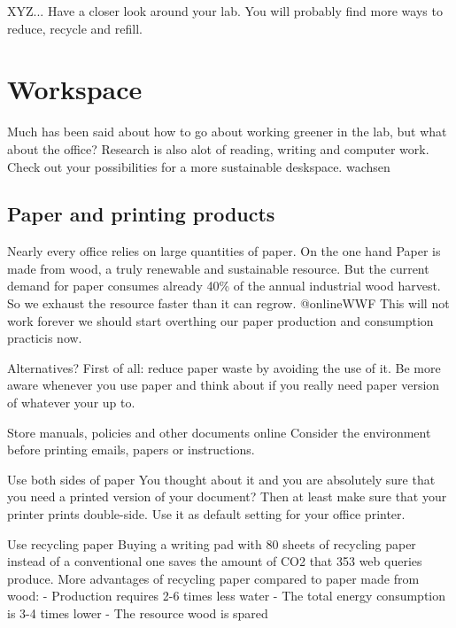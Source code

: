 \begin{suggest}{XYZ...}
	Have a closer look around your lab. You will probably find more ways to reduce, recycle and refill. 
\end{suggest}


\section{Workspace}

 Much has been said about how to go about working greener in the lab, but what about the office? Research is also alot of reading, writing and computer work. Check out your possibilities for a more sustainable deskspace. 
 wachsen
\subsection{Paper and printing products}
	
	Nearly every office relies on large quantities of paper. On the one hand Paper is made from wood, a truly renewable and sustainable resource. But the current demand for paper consumes already 40\% of the annual industrial wood harvest. So we exhaust the resource faster than it can regrow.  @online{WWF} This will not work forever we should start overthing our paper production and consumption practicis now. 

\begin{suggest}{Alternatives?}
	First of all: reduce paper waste by avoiding the use of it. 
	Be more aware whenever you use paper and think about if you really need paper version of whatever your up to. 
	\begin{suggest}{Store manuals, policies and other documents online}
		 Consider the environment before printing emails, papers or instructions. 
	\end{suggest}
\end{suggest}

\begin{suggest}{Use both sides of paper}
	You thought about it and you are absolutely sure that you need a printed version of your document? Then at least make sure that your printer prints double-side. Use it as default setting for your office printer.
\end{suggest}

\begin{suggest}{Use recycling paper}
	Buying a writing pad with 80 sheets of recycling paper instead of a conventional one 
	saves the amount of CO2 that 353 web queries produce.
	More advantages of recycling paper compared to paper made from wood:  
	- Production requires 2-6 times less water 
	- The total energy consumption is 3-4 times lower 
	- The resource wood is spared
\end{suggest}
	
